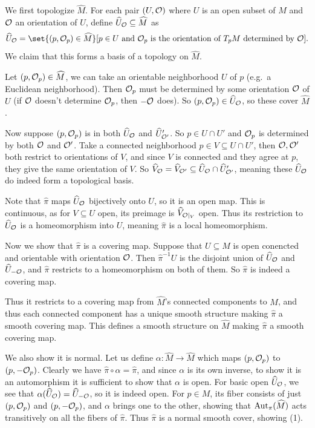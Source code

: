 \eprop

\bproof

    We first topologize $\hat M$.
    For each pair $(U,{{\cal O}})$ where $U$ is an open subset of $M$ and ${{\cal O}}$ an orientation of $U$, define
    $\widehat U_{{\cal O}}\subseteq\widehat M$ as
    $$ \hat U_\O = \set{(p,\O_p)\in\hat M}[\hbox{$p\in U$ and $\O_p$ is the orientation of $T_pM$ determined by $\O$}] . $$
    We claim that this forms a basis of a topology on $\hat M$.

    Let $(p,{{\cal O}}_p)\in\widehat M$, we can take an orientable neighborhood $U$ of $p$ (e.g.\ a Euclidean neighborhood).
    Then ${{\cal O}}_p$ must be determined by some orientation ${{\cal O}}$ of $U$ (if ${{\cal O}}$ doesn't determine ${{\cal O}}_p$, then $-{{\cal O}}$ does).
    So $(p,{{\cal O}}_p)\in\widehat U_{{\cal O}}$, so these cover $\hat M$.

    Now suppose $(p,{{\cal O}}_p)$ is in both $\widehat U_{{\cal O}}$ and $\widehat U'_{{{\cal O}}'}$.
    So $p\in U\cap U'$ and ${{\cal O}}_p$ is determined by both ${{\cal O}}$ and ${{\cal O}}'$.
    Take a connected neighborhood $p\in V\subseteq U\cap U'$, then ${{\cal O}},{{\cal O}}'$ both restrict to orientations of $V$,
    and since $V$ is connected and they agree at $p$, they give the same orientation of $V$.
    So $\widehat V_{{\cal O}}=\widehat V_{{{\cal O}}'}\subseteq\widehat U_{{\cal O}}\cap\widehat U'_{{{\cal O}}'}$, meaning these $\widehat U_{{\cal O}}$ do indeed form a topological
    basis.

    Note that $\hat\pi$ maps $\widehat U_{{\cal O}}$ bijectively onto $U$, so it is an open map.
    This is continuous, as for $V\subseteq U$ open, its preimage is $\widehat V_{{{\cal O}}|_V}$ open.
    Thus its restriction to $\widehat U_{{\cal O}}$ is a homeomorphism into $U$, meaning $\hat\pi$ is a local homeomorphism.

    Now we show that $\hat\pi$ is a covering map.
    Suppose that $U\subseteq M$ is open conencted and orientable with orientation ${{\cal O}}$.
    Then $\hat\pi^{-1}U$ is the disjoint union of $\widehat U_{{\cal O}}$ and $\widehat U_{-{{\cal O}}}$, and $\hat\pi$ restricts to a homeomorphism
    on both of them.
    So $\hat\pi$ is indeed a covering map.

    Thus it restricts to a covering map from $\hat M$'s connected components to $M$, and thus each connected component
    has a unique smooth structure making $\hat\pi$ a smooth covering map.
    This defines a smooth structure on $\hat M$ making $\hat\pi$ a smooth covering map.

    We also show it is normal.
    Let us define $\alpha\colon\hat M\to\hat M$ which maps $(p,{{\cal O}}_p)$ to $(p,-{{\cal O}}_p)$.
    Clearly we have $\hat\pi\circ\alpha=\hat\pi$, and since $\alpha$ is its own inverse, to show it is an automorphism it is sufficient to
    show that $\alpha$ is open.
    For basic open $\widehat U_{{\cal O}}$, we see that $\alpha(\widehat U_{{\cal O}})=\widehat U_{-{{\cal O}}}$, so it is indeed open.
    For $p\in M$, its fiber consists of just $(p,{{\cal O}}_p)$ and $(p,-{{\cal O}}_p)$, and $\alpha$ brings one to the other, showing that ${\rm Aut}_\pi(\widehat M)$ acts transitively
    on all the fibers of $\hat\pi$.
    Thus $\hat\pi$ is a normal smooth cover, showing (1).

